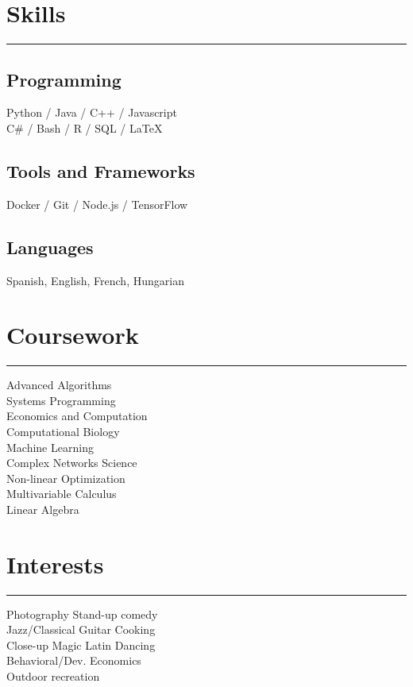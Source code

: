 \documentclass[]{dafirebanks-resume-openfont}
\begin{document}
\begin{minipage}[t]{0.33\textwidth}
\section{Skills}
\vspace{-3pt}
{\color{blue}\hrule width 45pt} \vspace{5pt}
\subsection{Programming}
Python / Java / C++ / Javascript \\
C\# / Bash / R / SQL / \LaTeX

\sectionsep 
\subsection{Tools and Frameworks}
Docker / Git / Node.js / TensorFlow
\sectionsep
\subsection{Languages}
Spanish, English, French, Hungarian
\sectionsep 


\section{Coursework}
\vspace{-3pt}
{\color{blue} \hrule width 107pt} \vspace{5pt}
Advanced Algorithms \\
Systems Programming \\
Economics and Computation \\
Computational Biology\\
Machine Learning\\
Complex Networks Science \\
Non-linear Optimization\\
Multivariable Calculus \\
Linear Algebra \\ 
\sectionsep


\section{Interests}
\vspace{-3pt}
{\color{blue}\hrule width 78pt \vspace{5pt}}
Photography \textbullet{} Stand-up comedy \\   
\textbullet{} Jazz/Classical Guitar \textbullet{} Cooking\\ 
Close-up Magic \textbullet{} Latin Dancing \\
\textbullet{} Behavioral/Dev. Economics\\  
 Outdoor recreation


\end{minipage}
\end{document}
